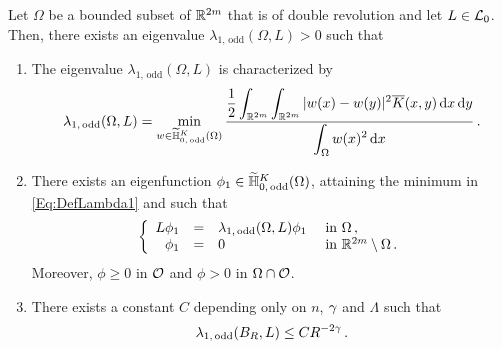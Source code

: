\begin{lemma}
\label{Lemma:FirstOddEigenfunction}
Let $\Omega$ be a bounded subset of $\mathbb{R}^{2m}$ that is of double revolution and let $L\in \mathcal{L}_0$. Then, there exists an eigenvalue $\lambda_{1, \, \mathrm{odd}}(\Omega, L) > 0$ such that
\begin{enumerate}
\item The eigenvalue $\lambda_{1, \, \mathrm{odd}}(\Omega, L)$ is characterized by
\begin{equation}
\label{Eq:DefLambda1}
\lambda_{1, \, \mathrm{odd}}(\Omega, L) = \min_{w \in \widetilde{\mathbb{H}}^K_{0, \, \mathrm{odd}}(\Omega)} \dfrac{\dfrac{1}{2}  \displaystyle\int_{\mathbb{R}^{2m}} \int_{\mathbb{R}^{2m}} |w(x) - w(y)|^2 \overline{K}(x,y) \,\mathrm{d} x \,\mathrm{d} y}{ \displaystyle \int_\Omega w(x)^2 \,\mathrm{d} x}\,.
\end{equation}
\item There exists an eigenfunction $\phi_1\in \widetilde{\mathbb{H}}^K_{0, \, \mathrm{odd}}(\Omega)$, attaining the minimum in \eqref{Eq:DefLambda1} and such that
$$
\left\{\begin{array}{rcll}
L\phi_1 &=& \lambda_{1, \, \mathrm{odd}}(\Omega, L) \phi_1 & \textrm{ in } \Omega\,,\\
\phi_1 & = & 0 & \textrm{ in } \mathbb{R}^{2m}\setminus \Omega\,.
\end{array} \right.
$$
Moreover, $\phi \geq 0$ in $\mathcal{O}$ and $\phi > 0$ in $\Omega \cap \mathcal{O}$.
\item There exists a constant $C$ depending only on $n$, $\gamma$ and $\Lambda$ such that
$$
\lambda_{1, \, \mathrm{odd}}(B_R, L) \leq C R^{-2\gamma}\,. 
$$ 
\end{enumerate}
\end{lemma}


